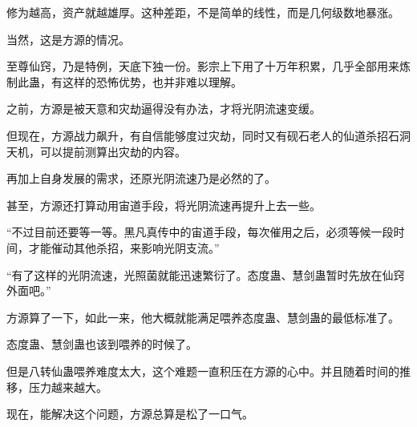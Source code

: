 \begin{this_body}
修为越高，资产就越雄厚。这种差距，不是简单的线性，而是几何级数地暴涨。

当然，这是方源的情况。

至尊仙窍，乃是特例，天底下独一份。影宗上下用了十万年积累，几乎全部用来炼制此蛊，有这样的恐怖优势，也并非难以理解。

之前，方源是被天意和灾劫逼得没有办法，才将光阴流速变缓。

但现在，方源战力飙升，有自信能够度过灾劫，同时又有砚石老人的仙道杀招石洞天机，可以提前测算出灾劫的内容。

再加上自身发展的需求，还原光阴流速乃是必然的了。

甚至，方源还打算动用宙道手段，将光阴流速再提升上去一些。

“不过目前还要等一等。黑凡真传中的宙道手段，每次催用之后，必须等候一段时间，才能催动其他杀招，来影响光阴支流。”

“有了这样的光阴流速，光照菌就能迅速繁衍了。态度蛊、慧剑蛊暂时先放在仙窍外面吧。”

方源算了一下，如此一来，他大概就能满足喂养态度蛊、慧剑蛊的最低标准了。

态度蛊、慧剑蛊也该到喂养的时候了。

但是八转仙蛊喂养难度太大，这个难题一直积压在方源的心中。并且随着时间的推移，压力越来越大。

现在，能解决这个问题，方源总算是松了一口气。

\end{this_body}

